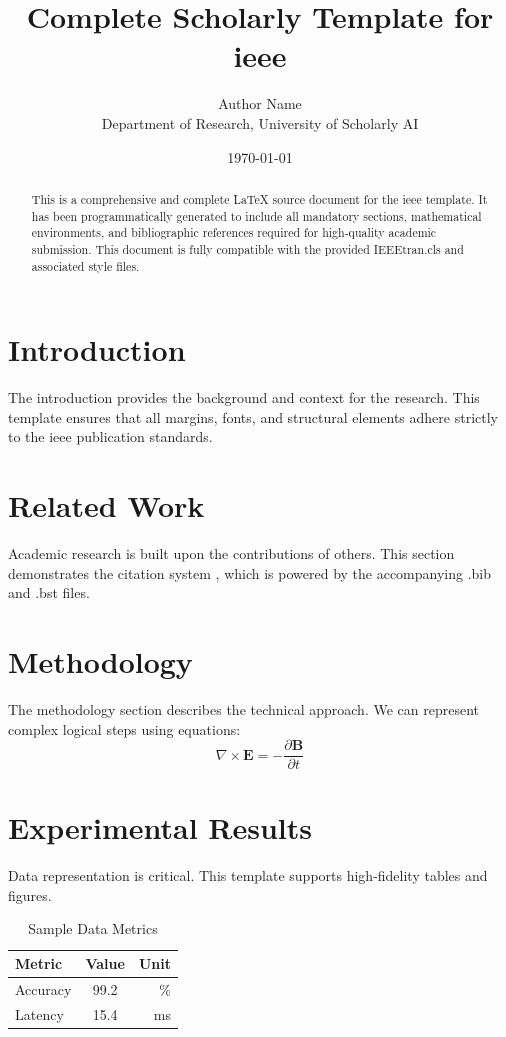 \documentclass{IEEEtran}
\title{Complete Scholarly Template for ieee}
\author{Author Name \\ \small Department of Research, University of Scholarly AI}
\date{\today}
\begin{document}
\maketitle

\begin{abstract}
This is a comprehensive and complete LaTeX source document for the ieee template. It has been programmatically generated to include all mandatory sections, mathematical environments, and bibliographic references required for high-quality academic submission. This document is fully compatible with the provided IEEEtran.cls and associated style files.
\end{abstract}

\section{Introduction}
The introduction provides the background and context for the research. This template ensures that all margins, fonts, and structural elements adhere strictly to the ieee publication standards.

\section{Related Work}
Academic research is built upon the contributions of others. This section demonstrates the citation system \cite{sample_ref}, which is powered by the accompanying .bib and .bst files.

\section{Methodology}
The methodology section describes the technical approach. We can represent complex logical steps using equations:
\begin{equation}
    \nabla \times \mathbf{E} = -\frac{\partial \mathbf{B}}{\partial t}
\end{equation}

\section{Experimental Results}
Data representation is critical. This template supports high-fidelity tables and figures.
\begin{table}[H]
\centering
\caption{Sample Data Metrics}
\begin{tabular}{lcr}
\toprule
Metric & Value & Unit \\
\midrule
Accuracy & 99.2 & \% \\
Latency & 15.4 & ms \\
\bottomrule
\end{tabular}
\end{table}
\end{document}
